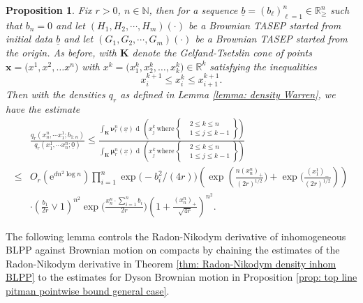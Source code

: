 \documentclass[11pt, reqno]{amsart}
\numberwithin{equation}{section}
\newcounter{dummy} \numberwithin{dummy}{section}
\newtheorem{proposition}[dummy]{Proposition}
\newcommand{\N}{\ensuremath{\mathbb{N}}}
\newcommand{\R}{\ensuremath{\mathbb{R}}}
\newcommand{\diff}{\ensuremath{\operatorname{d}\!}}
\begin{document}
\begin{proposition}\label{prop: estimate density final}
Fix $r>0$, $n\in \N$, then for a sequence $\underline{b} = (b_\ell)_{\ell =1}^n \in \R^n_{\ge}$ such that $b_n = 0$ and let $(H_1, H_2, \cdots, H_m)(\cdot)$ be a Brownian TASEP started from initial data $\underline{b}$ and  let $(G_1, G_2, \cdots, G_m)(\cdot)$ be a Brownian TASEP started from the origin. As before, with $\boldsymbol{K}$ denote the Gelfand-Tsetslin cone of  points ${\mathbf x}= \bigl(x^{1},x^{2}, \ldots x^{n}\bigr)$ with  $x^{k}=\bigl(x^{k}_1,x^{k}_2, \ldots ,x^{k}_k\bigr) \in {\R}^k$ satisfying 
the inequalities 
\begin{equation*}
 x^{k+1}_{i} \leq x^{k}_i \leq x^{k+1}_{i+1}.
\end{equation*}
    Then with the densities $q_r$ as defined in Lemma \ref{lemma: density Warren}, we have the estimate
    \begin{equation*}
\begin{array}{cc}
    &\frac{q_r(x^n_n, \cdots x^1_1; b_{1:n})}{q_r(x^1_1, \cdots x^n_n; \underline{0})}\le \frac{\displaystyle\int_{\boldsymbol{K}} \boldsymbol{\nu}^n_{r}(\underline{x})\diff\, \left(x^k_j\, \mathrm{where}\, \left.\begin{cases}
       &2\le k \le n\\
       &1\le j \le k-1
   \end{cases}\right\} \right)}{\displaystyle\int_{\boldsymbol{K}} \boldsymbol{\mu}^n_r (\underline{x})\diff\, \left(x^k_j\, \mathrm{where}\, \left.\begin{cases}
       &2\le k \le n\\
       &1\le j \le k-1
   \end{cases}\right\} \right)}\\
    \le &O_r(\mathrm{e}^{dn^2\log n})\displaystyle\prod^n_{i=1}\exp\big(-b_i^2/(4r)\big)\left( \exp\left(\frac{n(x^n_n)_+}{(2r)^{1/2}}\big)+\exp\big(\frac{(x^1_1)_-}{(2r)^{1/2}}\right)\right)\\
   & \cdot\left(\frac{b_1}{2r}\lor 1\right)^{n^2}\exp\big(\frac{x^n_n \cdot \sum_{i=1}^n b_i}{2r}\big)\left( 1 + \frac{(x^n_n)_+}{\sqrt{4r}}\right)^{n^2}.
   \end{array}
\end{equation*}
\end{proposition}

The following lemma controls the Radon-Nikodym derivative of inhomogeneous BLPP against Brownian motion on compacts by chaining the estimates of the Radon-Nikodym derivative in Theorem \ref{thm: Radon-Nikodym  density inhom BLPP} to the estimates for Dyson Brownian motion in Proposition \ref{prop: top line pitman pointwise bound general case}.
\end{document}
